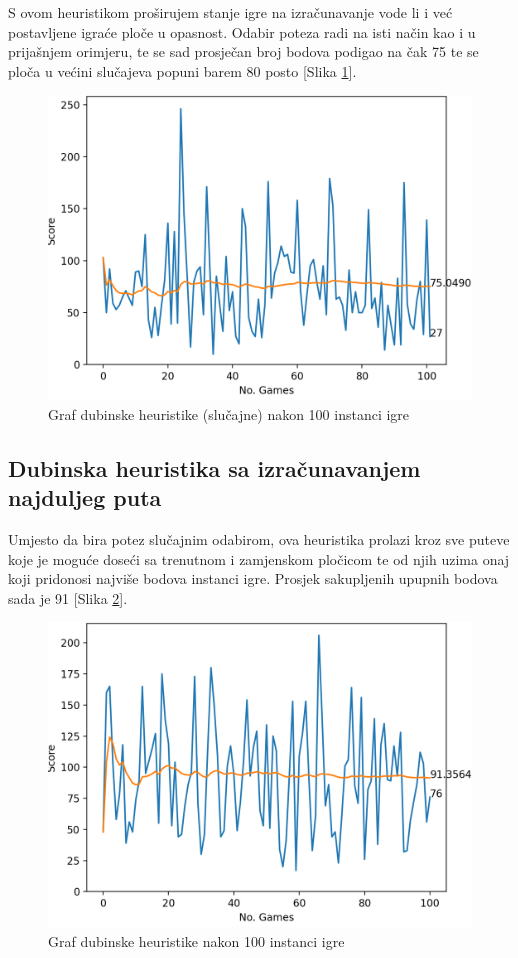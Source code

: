 \documentclass[zavrsnirad]{fer}
\begin{document}
S ovom heuristikom proširujem stanje igre na izračunavanje vode li i već postavljene igraće ploče u opasnost. Odabir poteza radi na isti način kao i u prijašnjem orimjeru, te se sad prosječan broj bodova podigao na čak 75 te se ploča u većini slučajeva popuni barem 80 posto [Slika \ref{slk:reach_graph}].

\begin{figure}[htb]
	\centering
	\includegraphics[width=0.68\linewidth]{Figures/reach.png} 
	\caption{Graf dubinske heuristike (slučajne) nakon 100 instanci igre}
	\label{slk:reach_graph}
\end{figure}


\subsection{Dubinska heuristika sa izračunavanjem najduljeg puta}
\label{pog:dubinska}

Umjesto da bira potez slučajnim odabirom, ova heuristika prolazi kroz sve puteve koje je moguće doseći sa trenutnom i zamjenskom pločicom te od njih uzima onaj koji pridonosi najviše bodova instanci igre. Prosjek sakupljenih upupnih bodova sada je 91 [Slika \ref{slk:depth_graph}].

\begin{figure}[htb]
	\centering
	\includegraphics[width=0.68\linewidth]{Figures/depth.png} 
	\caption{Graf dubinske heuristike nakon 100 instanci igre}
	\label{slk:depth_graph}
\end{figure}
\end{document}
